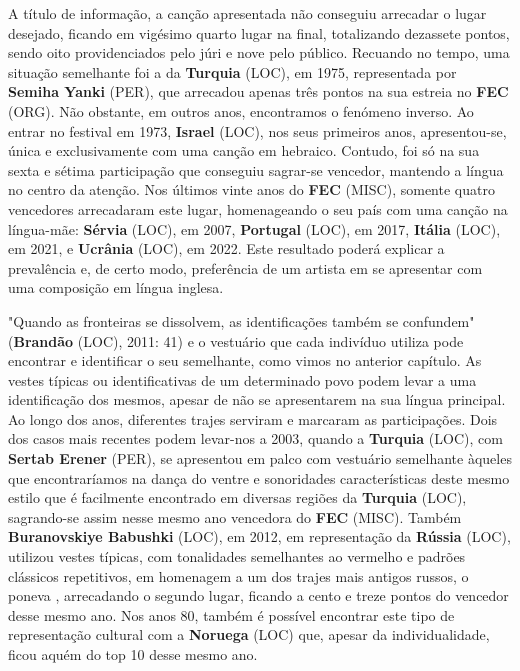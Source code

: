 \documentclass[12pt,a4paper]{article}
\begin{document}
A  título  de  informação,  a  canção  apresentada  não  conseguiu  arrecadar  o  lugar desejado, ficando em vigésimo quarto lugar na final, totalizando dezassete pontos, sendo oito  providenciados  pelo  júri  e  nove  pelo  público.  Recuando  no  tempo,  uma  situação semelhante foi a da \textbf{Turquia} (LOC), em  1975, representada por \textbf{Semiha Yanki} (PER),  que  arrecadou apenas três pontos na sua estreia no \textbf{FEC} (ORG). Não obstante, em outros anos, encontramos o fenómeno  inverso.  Ao  entrar  no  festival  em  1973,  \textbf{Israel} (LOC),  nos  seus  primeiros  anos, apresentou-se, única e exclusivamente com uma canção em hebraico. Contudo, foi só na sua sexta e sétima participação que conseguiu sagrar-se vencedor, mantendo a língua no centro  da  atenção.  Nos  últimos  vinte  anos  do  \textbf{FEC} (MISC),  somente  quatro  vencedores arrecadaram este lugar, homenageando o seu país com uma canção na língua-mãe: \textbf{Sérvia} (LOC), em 2007, \textbf{Portugal} (LOC), em 2017, \textbf{Itália} (LOC), em 2021, e \textbf{Ucrânia} (LOC), em 2022. Este resultado poderá explicar a prevalência e, de certo modo, preferência de um artista em se apresentar com uma composição em língua inglesa.

"Quando  as  fronteiras  se  dissolvem,  as  identificações  também  se  confundem" (\textbf{Brandão} (LOC), 2011: 41) e o vestuário que cada indivíduo utiliza pode encontrar e identificar o seu semelhante, como vimos no anterior capítulo. As vestes típicas ou identificativas de um  determinado povo podem  levar a uma identificação dos mesmos,  apesar de não se apresentarem  na  sua  língua  principal.  Ao  longo  dos  anos,  diferentes  trajes  serviram  e marcaram as participações. Dois dos casos mais recentes podem levar-nos a 2003, quando a \textbf{Turquia} (LOC), com \textbf{Sertab Erener} (PER), se apresentou em palco com vestuário semelhante àqueles que encontraríamos na dança do ventre e sonoridades características deste mesmo estilo que  é  facilmente  encontrado  em  diversas  regiões  da  \textbf{Turquia} (LOC),  sagrando-se  assim  nesse mesmo  ano  vencedora  do  \textbf{FEC} (MISC).  Também  \textbf{Buranovskiye  Babushki} (LOC),  em  2012,  em representação  da  \textbf{Rússia} (LOC),  utilizou  vestes  típicas,  com  tonalidades  semelhantes  ao vermelho e padrões clássicos repetitivos, em homenagem  a um dos trajes mais antigos russos, o poneva , arrecadando o segundo lugar, ficando a cento e treze pontos do vencedor desse mesmo ano. Nos anos 80, também é possível encontrar este tipo de representação cultural  com  a  \textbf{Noruega} (LOC)  que,  apesar  da  individualidade,  ficou  aquém  do top 10  desse mesmo ano.
\end{document}
